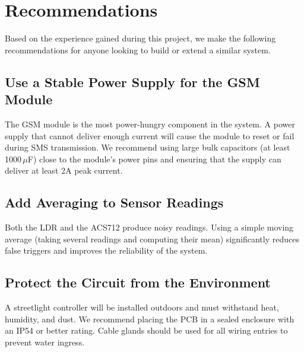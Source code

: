 \documentclass[12pt,a4paper]{article}
\begin{document}
\newpage
\listoffigures
{}

\newpage
\listoftables
{}

\newpage
\tableofcontents

\newpage
{}


\section{Recommendations}

Based on the experience gained during this project, we make the following recommendations for anyone looking to build or extend a similar system.

\subsection{Use a Stable Power Supply for the GSM Module}

The GSM module is the most power-hungry component in the system. A power supply that cannot deliver enough current will cause the module to reset or fail during SMS transmission. We recommend using large bulk capacitors (at least 1000\,$\mu$F) close to the module's power pins and ensuring that the supply can deliver at least 2A peak current.

\subsection{Add Averaging to Sensor Readings}

Both the LDR and the ACS712 produce noisy readings. Using a simple moving average (taking several readings and computing their mean) significantly reduces false triggers and improves the reliability of the system.

\subsection{Protect the Circuit from the Environment}

A streetlight controller will be installed outdoors and must withstand heat, humidity, and dust. We recommend placing the PCB in a sealed enclosure with an IP54 or better rating. Cable glands should be used for all wiring entries to prevent water ingress.
\end{document}
